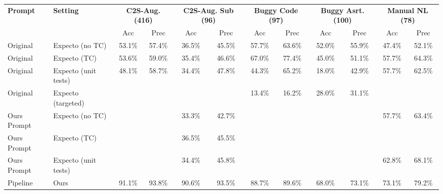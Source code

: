 \begin{table}[t]
\centering
\footnotesize
\setlength{\tabcolsep}{3pt}
\begin{tabular}{llcccccccccc}
\toprule
\textbf{Prompt} & \textbf{Setting} & \multicolumn{2}{c}{\textbf{C2S-Aug. (416)}} & \multicolumn{2}{c}{\textbf{C2S-Aug. Sub (96)}} & \multicolumn{2}{c}{\textbf{Buggy Code (97)}} & \multicolumn{2}{c}{\textbf{Buggy Asrt. (100)}} & \multicolumn{2}{c}{\textbf{Manual NL (78)}} \\
\cmidrule(lr){3-4}\cmidrule(lr){5-6}\cmidrule(lr){7-8}\cmidrule(lr){9-10}\cmidrule(lr){11-12}
& & Acc & Prec & Acc & Prec & Acc & Prec & Acc & Prec & Acc & Prec \\
\midrule
Original & Expecto (no TC) & 53.1\% & 57.4\% & 36.5\% & 45.5\% & 57.7\% & 63.6\% & 52.0\% & 55.9\% & 47.4\% & 52.1\% \\
Original & Expecto (TC) & 53.6\% & 59.0\% & 35.4\% & 46.6\% & 67.0\% & 77.4\% & 45.0\% & 51.1\% & 57.7\% & 64.3\% \\
Original & Expecto (unit tests) & 48.1\% & 58.7\% & 34.4\% & 47.8\% & 44.3\% & 65.2\% & 18.0\% & 42.9\% & 57.7\% & 62.5\% \\
Original & Expecto (targeted) &  &  &  &  & 13.4\% & 16.2\% & 28.0\% & 31.1\% &  &  \\
\midrule
Ours Prompt & Expecto (no TC) &  &  & 33.3\% & 42.7\% &  &  &  &  & 57.7\% & 63.4\% \\
Ours Prompt & Expecto (TC) &  &  & 36.5\% & 45.5\% &  &  &  &  &  &  \\
Ours Prompt & Expecto (unit tests) &  &  & 34.4\% & 45.8\% &  &  &  &  & 62.8\% & 68.1\% \\
\midrule
Pipeline & Ours & 91.1\% & 93.8\% & 90.6\% & 93.5\% & 88.7\% & 89.6\% & 68.0\% & 73.1\% & 73.1\% & 79.2\% \\
\bottomrule
\end{tabular}

\end{table}
